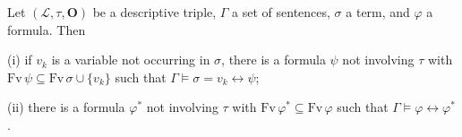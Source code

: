 Let $(\mathcal{L}, \tau, \mathbf{O})$ be a descriptive triple, $\Gamma$ a set of sentences, $\sigma$ a term, and $\varphi$ a formula. Then

(i) if $v_k$ is a variable not occurring in $\sigma$, there is a formula $\psi$ not involving $\tau$ with $\text{Fv}\,\psi \subseteq \text{Fv}\,\sigma \cup \{v_k\}$ such that $\Gamma \models \sigma = v_k \leftrightarrow \psi$;

(ii) there is a formula $\varphi^*$ not involving $\tau$ with $\text{Fv}\,\varphi^* \subseteq \text{Fv}\,\varphi$ such that $\Gamma \models \varphi \leftrightarrow \varphi^*$.
